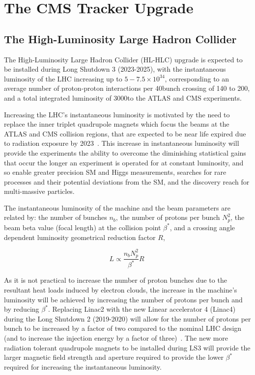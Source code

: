 \chapter{The CMS Tracker Upgrade}\label{chapter:tk-upgrade}
 
\section{The High-Luminosity Large Hadron Collider} \label{sec:hl-lhc}
The High-Luminosity Large Hadron Collider (HL-HLC) upgrade is expected to be installed during Long Shutdown 3 (2023-2025), with the instantaneous luminosity of the LHC increasing up to $5-7.5 \times {10}^{34}$\percms, corresponding to an average number of proton-proton interactions per 40\MHz bunch crossing of 140 to 200, and a total integrated luminosity of 3000\fbinv to the ATLAS and CMS experiments.

Increasing the LHC's instantaneous luminosity is motivated by the need to replace the inner triplet quadrupole magnets which focus the beams at the ATLAS and CMS collision regions, that are expected to be near life expired due to radiation exposure by 2023~\cite{hl-lhc-prelim-design-report,CMSCollaboration:2015zni}.
This increase in instantaneous luminosity will provide the experiments the ability to overcome the diminishing statistical gains that occur the longer an experiment is operated for at constant luminosity, and so enable greater precision SM and Higgs measurements, searches for rare processes and their potential deviations from the SM, and the discovery reach for multi-\TeV massive particles.

The instantaneous luminosity of the machine and the beam parameters are related by: the number of bunches $n_{b}$, the number of protons per bunch $N^{2}_{p}$, the beam beta value (focal length) at the collision point $\beta^{*}$, and a crossing angle dependent luminosity geometrical reduction factor $R$,

\begin{equation}
L \propto \frac{n_{b}N^{2}_{p}}{\beta^{*}} R  \;
\label{eq:machineLumi}
\end{equation}

As it is not practical to increase the number of proton bunches due to the resultant heat loads induced by electron clouds, the increase in the machine's luminosity will be achieved by increasing the number of protons per bunch and by  reducing $\beta^{*}$.
Replacing Linac2 with the new Linear accelerator 4 (Linac4) during the Long Shutdown 2 (2019-2020) will allow for the number of protons per bunch to be increased by a factor of two compared to the nominal LHC design (and to increase the injection energy by a factor of three)~\cite{linac4}.
The new more radiation tolerant quadrupole magnets to be installed during LS3 will provide the larger magnetic field strength and aperture required to provide the lower $\beta^{*}$ required for increasing the instantaneous luminosity. 

